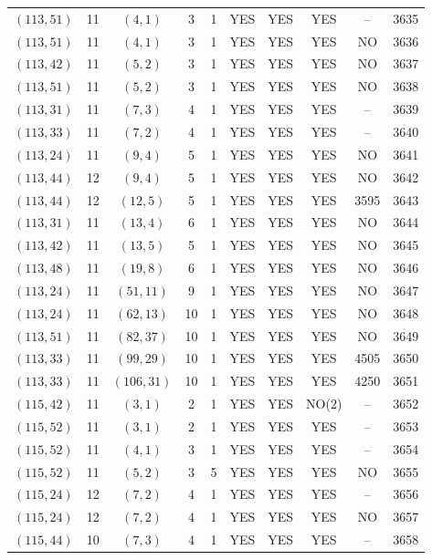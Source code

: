 \begin{longtable}{|c|c|c|c|c|c|c|c|c|c|}
$(113, 51)$ & 11 & $(4, 1)$ & 3 & 1 & YES & YES & YES & -- & 3635\\
$(113, 51)$ & 11 & $(4, 1)$ & 3 & 1 & YES & YES & YES & NO & 3636\\
$(113, 42)$ & 11 & $(5, 2)$ & 3 & 1 & YES & YES & YES & NO & 3637\\
$(113, 51)$ & 11 & $(5, 2)$ & 3 & 1 & YES & YES & YES & NO & 3638\\
$(113, 31)$ & 11 & $(7, 3)$ & 4 & 1 & YES & YES & YES & -- & 3639\\
$(113, 33)$ & 11 & $(7, 2)$ & 4 & 1 & YES & YES & YES & -- & 3640\\
$(113, 24)$ & 11 & $(9, 4)$ & 5 & 1 & YES & YES & YES & NO & 3641\\
$(113, 44)$ & 12 & $(9, 4)$ & 5 & 1 & YES & YES & YES & NO & 3642\\
$(113, 44)$ & 12 & $(12, 5)$ & 5 & 1 & YES & YES & YES & 3595 & 3643\\
$(113, 31)$ & 11 & $(13, 4)$ & 6 & 1 & YES & YES & YES & NO & 3644\\
$(113, 42)$ & 11 & $(13, 5)$ & 5 & 1 & YES & YES & YES & NO & 3645\\
$(113, 48)$ & 11 & $(19, 8)$ & 6 & 1 & YES & YES & YES & NO & 3646\\
$(113, 24)$ & 11 & $(51, 11)$ & 9 & 1 & YES & YES & YES & NO & 3647\\
$(113, 24)$ & 11 & $(62, 13)$ & 10 & 1 & YES & YES & YES & NO & 3648\\
$(113, 51)$ & 11 & $(82, 37)$ & 10 & 1 & YES & YES & YES & NO & 3649\\
$(113, 33)$ & 11 & $(99, 29)$ & 10 & 1 & YES & YES & YES & 4505 & 3650\\
$(113, 33)$ & 11 & $(106, 31)$ & 10 & 1 & YES & YES & YES & 4250 & 3651\\
$(115, 42)$ & 11 & $(3, 1)$ & 2 & 1 & YES & YES & NO(2) & -- & 3652\\
$(115, 52)$ & 11 & $(3, 1)$ & 2 & 1 & YES & YES & YES & -- & 3653\\
$(115, 52)$ & 11 & $(4, 1)$ & 3 & 1 & YES & YES & YES & -- & 3654\\
$(115, 52)$ & 11 & $(5, 2)$ & 3 & 5 & YES & YES & YES & NO & 3655\\
$(115, 24)$ & 12 & $(7, 2)$ & 4 & 1 & YES & YES & YES & -- & 3656\\
$(115, 24)$ & 12 & $(7, 2)$ & 4 & 1 & YES & YES & YES & NO & 3657\\
$(115, 44)$ & 10 & $(7, 3)$ & 4 & 1 & YES & YES & YES & -- & 3658\\

\end{longtable}
